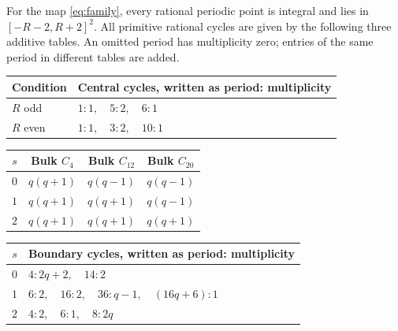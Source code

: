 \begin{theorem}\label{thm:main}
For the map \eqref{eq:family}, every rational periodic point is integral
and lies in $[-R-2,R+2]^2$. All primitive rational cycles are given by
the following three additive tables. An omitted period has multiplicity
zero; entries of the same period in different tables are added.

\begin{center}
\begin{minipage}{\linewidth}
\centering
\begin{tabular}{ll}
\toprule
Condition & Central cycles, written as period: multiplicity\\
\midrule
$R$ odd & $1:1,\quad 5:2,\quad 6:1$\\
$R$ even & $1:1,\quad 3:2,\quad 10:1$\\
\bottomrule
\end{tabular}
\label{tab:central}
\end{minipage}
\end{center}

\begin{center}
\begin{minipage}{\linewidth}
\centering
\begin{tabular}{cccc}
\toprule
$s$ & Bulk $C_4$ & Bulk $C_{12}$ & Bulk $C_{20}$\\
\midrule
$0$ & $q(q+1)$ & $q(q-1)$ & $q(q-1)$\\
$1$ & $q(q+1)$ & $q(q+1)$ & $q(q-1)$\\
$2$ & $q(q+1)$ & $q(q+1)$ & $q(q+1)$\\
\bottomrule
\end{tabular}
\label{tab:bulk-main}
\end{minipage}
\end{center}

\begin{center}
\begin{minipage}{\linewidth}
\centering
\begin{tabular}{cl}
\toprule
$s$ & Boundary cycles, written as period: multiplicity\\
\midrule
$0$ & $4:2q+2,\quad 14:2$\\
$1$ & $6:2,\quad 16:2,\quad 36:q-1,\quad (16q+6):1$\\
$2$ & $4:2,\quad 6:1,\quad 8:2q$\\
\bottomrule
\end{tabular}
\label{tab:boundary-main}
\end{minipage}
\end{center}


\end{theorem}
